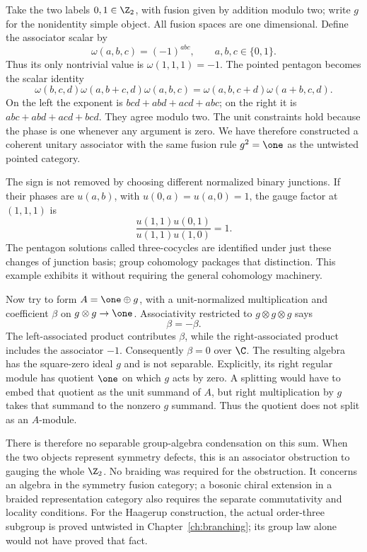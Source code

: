 \begin{example}
\label{ex:centers-Z2-obstruction}
Take the two labels $0,1\in\Z_2$, with fusion given by addition
modulo two; write $g$ for the nonidentity simple object. All
fusion spaces are one dimensional. Define the associator scalar by
\[
 \omega(a,b,c)=(-1)^{abc},\qquad a,b,c\in\{0,1\}.
\]
Thus its only nontrivial value is $\omega(1,1,1)=-1$.
The pointed pentagon becomes the scalar identity
\[
 \omega(b,c,d)\omega(a,b+c,d)\omega(a,b,c)
 =\omega(a,b,c+d)\omega(a+b,c,d).
\]
On the left the exponent is $bcd+abd+acd+abc$; on the
right it is $abc+abd+acd+bcd$. They agree modulo two.
The unit constraints hold because the phase is one whenever
any argument is zero. We have therefore constructed a coherent
unitary associator with the same fusion rule $g^2=\one$ as
the untwisted pointed category.

The sign is not removed by choosing different normalized binary
junctions. If their phases are $u(a,b)$, with
$u(0,a)=u(a,0)=1$, the gauge factor at $(1,1,1)$ is
\[
 \frac{u(1,1)u(0,1)}{u(1,1)u(1,0)}=1.
\]
The pentagon solutions called three-cocycles are identified under
just these changes of junction basis; group cohomology packages
that distinction. This example exhibits it without requiring the
general cohomology machinery.

Now try to form $A=\one\oplus g$, with a unit-normalized
multiplication and coefficient $\beta$ on $g\otimes g\to\one$.
Associativity restricted to $g\otimes g\otimes g$ says
\[
 \beta=-\beta.
\]
The left-associated product contributes $\beta$, while the
right-associated product includes the associator $-1$.
Consequently $\beta=0$ over $\C$. The resulting algebra has
the square-zero ideal $g$ and is not separable. Explicitly, its
right regular module has quotient $\one$ on which $g$ acts
by zero. A splitting would have to embed that quotient as the
unit summand of $A$, but right multiplication by $g$ takes
that summand to the nonzero $g$ summand. Thus the quotient
does not split as an $A$-module.

There is therefore no separable group-algebra condensation on
this sum. When the two objects represent symmetry defects, this
is an associator obstruction to gauging the whole $\Z_2$.
No braiding was required for the obstruction. It concerns an
algebra in the symmetry fusion category; a bosonic chiral
extension in a braided representation category also requires
the separate commutativity and locality conditions. For the
Haagerup construction, the actual order-three subgroup is proved
untwisted in Chapter~\ref{ch:branching}; its group law alone
would not have proved that fact.
\end{example}

